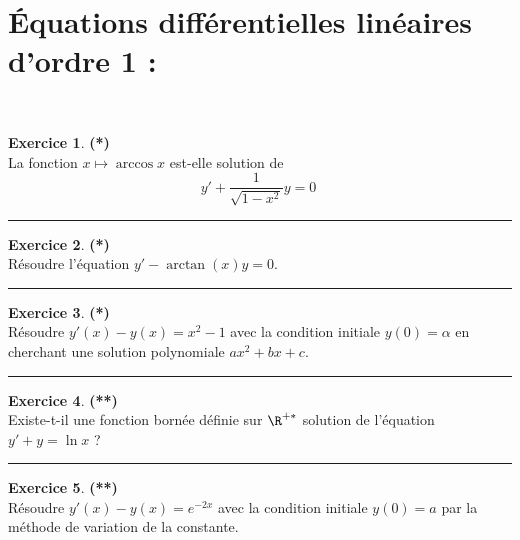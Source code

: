 \documentclass[a4paper,11pt]{article}
\theoremstyle{definition}
\newtheorem{exo}{Exercice} %
\begin{document}
\section*{Équations diﬀérentielles linéaires d’ordre 1 :}\hfill\\%
\begin{minipage}{1\linewidth}
	\begin{minipage}[t]{0.48\linewidth}
		\raggedright
		
				\begin{exo}\textbf{(*)}\quad\\[0.2cm]
				La fonction $x \mapsto \arccos x$ est-elle solution de
				$$y'+ \dfrac{1}{\sqrt{1-x^2}}y = 0\ $$
			\centering
			\rule{1\linewidth}{0.6pt}
		\end{exo}
	
		
		
			\begin{exo}\textbf{(*)}\quad\\[0.2cm]
		Résoudre l'équation $y' - \arctan(x)y = 0$.
		
		\centering
		\rule{1\linewidth}{0.6pt}
	\end{exo}
	
				
		\begin{exo}\textbf{(*)}\quad\\[0.2cm]
			Résoudre $y' (x ) - y (x ) = x^2 - 1$ avec la condition initiale $y (0) = \alpha $ en cherchant une solution
			polynomiale $a x^2 + bx + c$.
			
			\centering
			\rule{1\linewidth}{0.6pt}
		\end{exo}
		
		
		
		
		

		
		
		
	\end{minipage}	
	\hfill\vrule\hfill
	\begin{minipage}[t]{0.48\linewidth}
		\raggedright
		
		\begin{exo}\textbf{(**)}\quad\\[0.2cm]
	Existe-t-il une fonction bornée définie sur $\R^{+*}$ solution de l’équation $y' + y = \ln x$ ?


	\centering
	\rule{1\linewidth}{0.6pt}
\end{exo}

\begin{exo}\textbf{(**)}\quad\\[0.2cm]
	Résoudre $y' (x ) - y (x ) = e^{-2x}$ avec la condition initiale $y (0) = a$ par la méthode de variation de la constante.
	

\end{exo}
\end{minipage}
\end{minipage}
\end{document}
